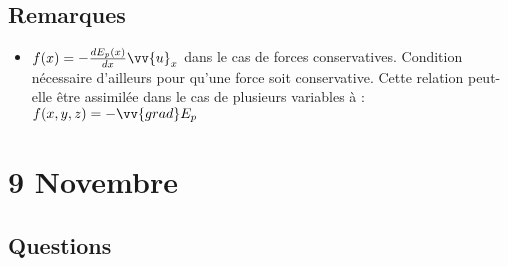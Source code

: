 \documentclass[a4paper, 11pt, hidelinks]{article}
\begin{document}
\subsection{Remarques}

\begin{itemize}
    \item $f(x)=-\frac{dE_p(x)}{dx}\vv{u}_x$ dans le cas de forces conservatives. Condition nécessaire
    d'ailleurs pour qu'une force soit conservative. Cette relation peut-elle être assimilée dans le cas 
    de plusieurs variables à : $f(x,y,z)=-\vv{grad}E_p$
\end{itemize}



\section{9 Novembre}

\subsection{Questions}
\end{document}
